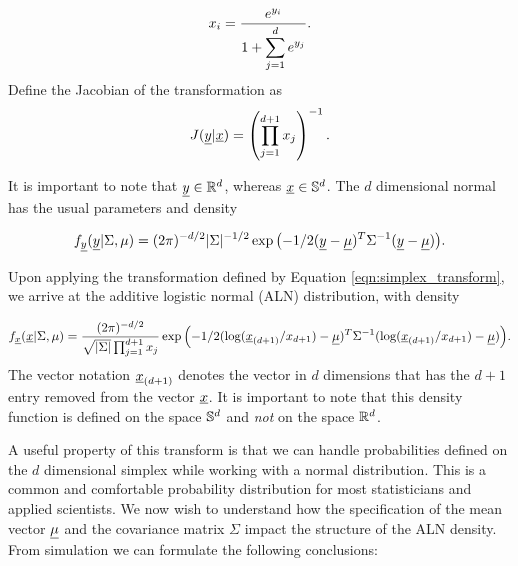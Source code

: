 \begin{equation}\label{eqn:simplex_transform}
x_i = \frac{e^{y_i}}{1+\displaystyle{\sum_{j=1}^de^{y_j}}}. \\
\end{equation}
Define the Jacobian of the transformation as
\begin{equation}\label{eqn:jacobian}
J(\underline{y} \vert \underline{x}) = \left( \prod_{j=1}^{d+1}x_j \right)^{-1}.
\end{equation}

It is important to note that $\underline{y}\in\mathbb{R}^{d}$, whereas $\underline{x}\in\mathbb{S}^{d}$. The $d$ dimensional normal has the usual parameters and density

\begin{equation}\label{eqn:multinormal}
f_{\underline{y}}(\underline{y}\vert \Sigma, \mu)=(2\pi)^{-d/2}|\Sigma|^{-1/2}\exp{\left(-1/2(\underline{y}-\underline{\mu})^T\Sigma^{-1}(\underline{y}-\underline{\mu})\right)}.
\end{equation}

Upon applying the transformation defined by Equation \ref{eqn:simplex_transform}, we arrive at the additive logistic normal (ALN) distribution, with density 

\begin{equation}
f_{\underline{x}}(\underline{x}\vert \Sigma, \mu)=\frac{(2\pi)^{-d/2}}{\sqrt{\vert\Sigma\vert}\prod_{j=1}^{d+1}x_j } 
\exp{\left(-1/2(\text{log}(\underline{x}_{(d+1)}/x_{d+1})-\underline{\mu})^T\Sigma^{-1}(\text{log}(\underline{x}_{(d+1)}/x_{d+1})-\underline{\mu})\right)}.
\end{equation}
The vector notation $\underline{x}_{(d+1)}$ denotes the vector in $d$ dimensions that has the $d+1$ entry removed from the vector $\underline{x}$. 
It is important to note that this density function is defined on the space $\mathbb{S}^{d}$ and \emph{not} on the space $\mathbb{R}^{d}$. 

A useful property of this transform is that we can handle probabilities defined on the $d$ dimensional simplex while working with a normal distribution. This is a common and comfortable probability distribution for most statisticians and applied scientists.
We now wish to understand how the specification of the mean vector $\underline{\mu}$ and the covariance matrix $\Sigma$ impact the structure of the ALN density. From simulation we can formulate the following conclusions: 

